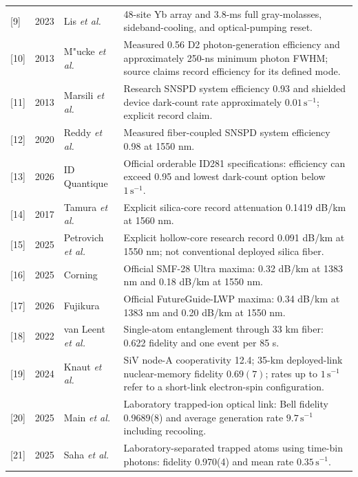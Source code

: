 \documentclass[10pt]{article}
\begin{document}
\begin{longtable}{L{0.055\textwidth}L{0.10\textwidth}L{0.24\textwidth}L{0.47\textwidth}}
  {[9]} & 2023 & Lis \emph{et al.} \cite{lis2023} & 48-site Yb array and 3.8-ms full gray-molasses, sideband-cooling, and optical-pumping reset. \\
  {[10]} & 2013 & M{"u}cke \emph{et al.} \cite{muecke2013} & Measured 0.56 D2 photon-generation efficiency and approximately 250-ns minimum photon FWHM; source claims record efficiency for its defined mode. \\
  {[11]} & 2013 & Marsili \emph{et al.} \cite{marsili2013} & Research SNSPD system efficiency 0.93 and shielded device dark-count rate approximately $0.01\,\mathrm{s}^{-1}$; explicit record claim. \\
  {[12]} & 2020 & Reddy \emph{et al.} \cite{reddy2020} & Measured fiber-coupled SNSPD system efficiency 0.98 at 1550 nm. \\
  {[13]} & 2026 & ID Quantique \cite{idq2026} & Official orderable ID281 specifications: efficiency can exceed 0.95 and lowest dark-count option below $1\,\mathrm{s}^{-1}$. \\
  {[14]} & 2017 & Tamura \emph{et al.} \cite{tamura2017} & Explicit silica-core record attenuation 0.1419 dB/km at 1560 nm. \\
  {[15]} & 2025 & Petrovich \emph{et al.} \cite{petrovich2025} & Explicit hollow-core research record 0.091 dB/km at 1550 nm; not conventional deployed silica fiber. \\
  {[16]} & 2025 & Corning \cite{corning2025} & Official SMF-28 Ultra maxima: 0.32 dB/km at 1383 nm and 0.18 dB/km at 1550 nm. \\
  {[17]} & 2026 & Fujikura \cite{fujikura2026} & Official FutureGuide-LWP maxima: 0.34 dB/km at 1383 nm and 0.20 dB/km at 1550 nm. \\
  {[18]} & 2022 & van Leent \emph{et al.} \cite{vanleent2022} & Single-atom entanglement through 33 km fiber: 0.622 fidelity and one event per 85 s. \\
  {[19]} & 2024 & Knaut \emph{et al.} \cite{knaut2024} & SiV node-A cooperativity 12.4; 35-km deployed-link nuclear-memory fidelity $0.69(7)$; rates up to $1\,\mathrm{s}^{-1}$ refer to a short-link electron-spin configuration. \\
  {[20]} & 2025 & Main \emph{et al.} \cite{main2025} & Laboratory trapped-ion optical link: Bell fidelity 0.9689(8) and average generation rate $9.7\,\mathrm{s}^{-1}$ including recooling. \\
  {[21]} & 2025 & Saha \emph{et al.} \cite{saha2025} & Laboratory-separated trapped atoms using time-bin photons: fidelity 0.970(4) and mean rate $0.35\,\mathrm{s}^{-1}$. \\

\end{longtable}
\end{document}

